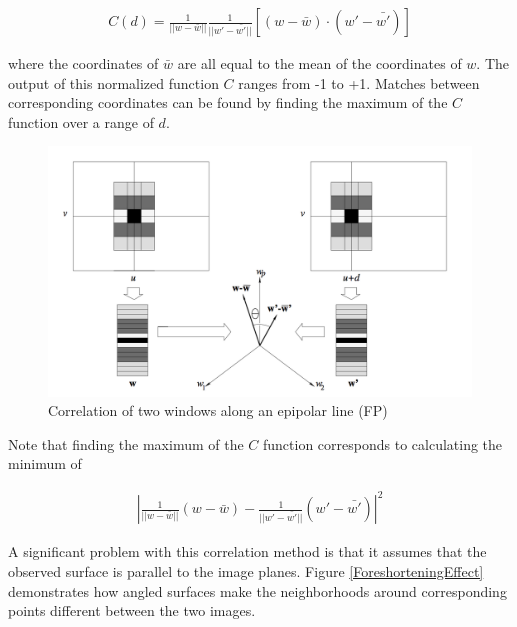 \documentclass[twoside]{article}
\begin{document}
\begin{align}
C(d) = \frac{1}{||w-\bar{w}||}\frac{1}{||w'-\bar{w'}||}[(w-\bar{w})\cdot(w'-\bar{w'})]
\end{align}

where the coordinates of $\bar{w}$ are all equal to the mean of the coordinates of $w$. The output of this normalized function $C$ ranges from -1 to +1. Matches between corresponding coordinates can be found by finding the maximum of the $C$ function over a range of $d$. 

\begin{figure}[h!]
  \begin{center}
	\includegraphics[scale=0.5]{CorrelationWindow.png}  \end{center}
  \caption{Correlation of two windows along an epipolar line (FP)}
  \label{CorrelationWindow}
\end{figure}

Note that finding the maximum of the $C$ function corresponds to calculating the minimum of 

\begin{align}
|\frac{1}{||w-\bar{w}||}(w-\bar{w})-\frac{1}{||w'-\bar{w'}||}(w'-\bar{w'})|^{2}
\end{align}

A significant problem with this correlation method is that it assumes that the observed surface is parallel to the image planes. Figure \ref{ForeshorteningEffect} demonstrates how angled surfaces make the neighborhoods around corresponding points different between the two images. 
\end{document}
